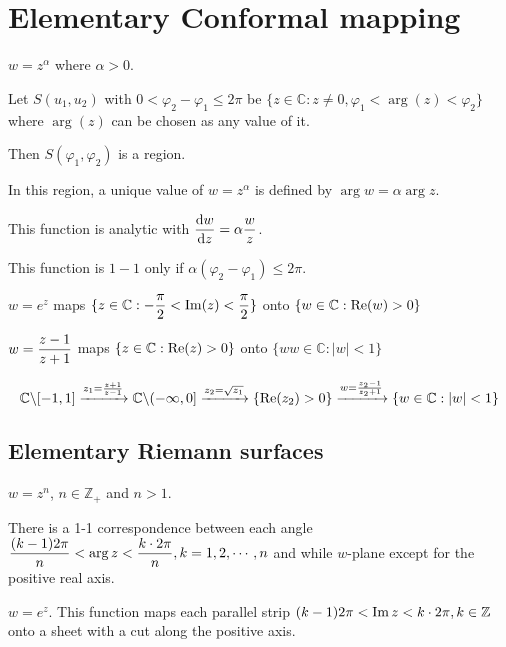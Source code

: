 \section{Elementary Conformal mapping}
\begin{example}
    $ w=z^\alpha $ where  $ \alpha>0 $.
    
    Let  $ S(u_1,u_2) $ with  $ 0<\varphi_2-\varphi_1 \leq 2\pi $ be  $ \{z\in \mathbb{C}:z\neq0,\varphi_1<\arg(z)<\varphi_2\} $ where  $ \arg(z) $ can be chosen as any value of it.   

    Then  $ S(\varphi_1,\varphi_2) $ is a region.
    
    In this region, a unique value of  $ w=z^\alpha $ is defined by  $ \arg w=\alpha\arg z $.
    
    This function is analytic with  $ \displaystyle\frac{\mathrm{d}w}{\mathrm{d}z}=\alpha\displaystyle\frac{w}{z} $.
    
    This function is  $ 1-1 $ only if  $ \alpha(\varphi_2-\varphi_1) \leq 2\pi $.  
\end{example}
\begin{example}
    $ w=e^z  $  maps  $ \{z\in \mathbb{C}:\displaystyle-\frac{\pi }{2}<\operatorname{Im}(z)<\frac{\pi}{2}\} $ onto  $ \{w\in\mathbb{C}:\mathrm{Re}( w)>0\} $ 
\end{example}
\begin{example}
    $ w=\displaystyle\frac{z-1}{z+1} $ maps  $ \{z\in \mathbb{C}:\mathrm{Re}(z)>0\} $ onto  $ \{ww\in \mathbb{C}:|w|<1\} $   
\end{example}
\begin{example}
    \begin{equation}
        \mathbb{C}\backslash[-1,1]\xrightarrow{z_1=\frac{z+1}{z-1}}\mathbb{C}\backslash(-\infty,0]\xrightarrow{z_2=\sqrt{z_1}}\{\mathrm{Re}(z_2)>0\}\xrightarrow{w=\frac{z_2-1}{z_2+1}}\{w\in\mathbb{C}:|w|<1\}
    \end{equation}
\end{example}
\subsection{Elementary Riemann surfaces}
\begin{example}
    $ w=z^n $,  $ n\in \mathbb{Z}_+ $ and  $ n>1 $.
    
    There is a 1-1 correspondence between each angle  $ \displaystyle\frac{(k-1)2\pi}{n}<\arg z<\frac{k\cdot 2\pi}{n},k=1,2,\cdots,n $ and while  $ w $-plane except for the positive real axis.  
\end{example}
\begin{example}
    $ w=e^z $. This function maps each parallel strip $ (k-1)2\pi<\operatorname{Im} z<k\cdot 2\pi, k\in \mathbb{Z} $ onto a sheet with a  cut along the positive axis.
\end{example}
